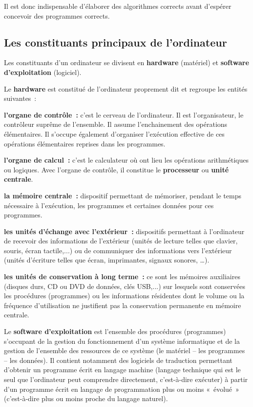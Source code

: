 		Il est donc indispensable d’élaborer des algorithmes corrects avant
		d’espérer concevoir des programmes corrects.

	\subsection{Les constituants principaux de l’ordinateur}

		Les constituants d’un ordinateur se divisent en \textbf{hardware}
		(matériel) et \textbf{software d’exploitation} (logiciel).
		
		Le \textbf{hardware} est constitué de l’ordinateur proprement dit et
		regroupe les entités suivantes~:

		\begin{liste}
		\item
			\textbf{l’organe de contrôle~:} c’est le cerveau de
			l'ordinateur. Il est l’organisateur, le contrôleur
			suprême de l’ensemble. Il assume l’enchainement des opérations
			élémentaires. Il s’occupe également d’organiser l’exécution effective
			de ces opérations élémentaires reprises dans les programmes.
		\item
			\textbf{l’organe de calcul~:} c’est le calculateur où ont lieu les
			opérations arithmétiques ou logiques. Avec l’organe de contrôle, il
			constitue le \textbf{processeur} ou \textbf{unité centrale}.
		\item
			\textbf{la mémoire centrale~:} dispositif permettant de mémoriser,
			pendant le temps nécessaire à l’exécution, les programmes et certaines
			données pour ces programmes.
		\item
			\textbf{les unités d’échange avec l’extérieur~:} dispositifs permettant
			à l’ordinateur de recevoir des informations de l’extérieur (unités de
			lecture telles que clavier, souris, écran tactile,...) ou de
			communiquer des informations vers l’extérieur (unités d’écriture telles
			que écran, imprimantes, signaux sonores, \dots).
		\item
			\textbf{les unités de conservation à long terme~:} ce sont les mémoires
			auxiliaires (disques durs, CD ou DVD de données, clés USB,...) sur
			lesquels sont conservées les procédures (programmes) ou les
			informations résidentes dont le volume ou la fréquence d’utilisation ne
			justifient pas la conservation permanente en mémoire centrale.
		\end{liste}
		
		Le \textbf{software d’exploitation} est l’ensemble des procédures
		(programmes) s’occupant de la gestion du fonctionnement d’un système
		informatique et de la gestion de l’ensemble des ressources de ce
		système (le matériel – les programmes – les données). Il contient
		notamment des logiciels de traduction permettant d’obtenir un programme
		écrit en langage machine (langage technique qui est le seul que
		l’ordinateur peut comprendre directement, c’est-à-dire exécuter) à
		partir d’un programme écrit en langage de programmation plus ou moins
		«~évolué~» (c’est-à-dire plus ou moins proche du langage naturel).

